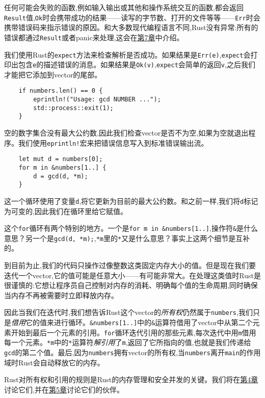 任何可能会失败的函数,例如输入输出或其他和操作系统交互的函数,都会返回\texttt{Result}值,\texttt{Ok}时会携带成功的结果——读写的字节数、打开的文件等等——\texttt{Err}时会携带错误码来指示错误的原因。和大多数现代编程语言不同,Rust没有异常:所有的错误都通过\texttt{Result}或者panic来处理,这会在\hyperref[ch07]{第7章}中介绍。

我们使用Rust的\texttt{expect}方法来检查解析是否成功。如果结果是\texttt{Err(e)},\texttt{expect}会打印出包含\texttt{e}的描述错误的消息。如果结果是\texttt{Ok(v)},\texttt{expect}会简单的返回\texttt{v},之后我们才能把它添加到vector的尾部。

\begin{verbatim}
    if numbers.len() == 0 {
        eprintln!("Usage: gcd NUMBER ...");
        std::process::exit(1);
    }
\end{verbatim}

空的数字集合没有最大公约数,因此我们检查vector是否不为空,如果为空就退出程序。我们使用\texttt{eprintln!}宏来把错误信息写入到标准错误输出流。

\begin{verbatim}
    let mut d = numbers[0];
    for m in &numbers[1..] {
        d = gcd(d, *m);
    }
\end{verbatim}

这一个循环使用了变量\texttt{d},将它更新为目前的最大公约数。和之前一样,我们将\texttt{d}标记为可变的,因此我们在循环里给它赋值。

这个\texttt{for}循环有两个特别的地方。一个是\texttt{for m in \&numbers[1..]},操作符\texttt{\&}是什么意思？另一个是\texttt{gcd(d, *m);},\texttt{*m}里的\texttt{*}又是什么意思？事实上这两个细节是互补的。

到目前为止,我们的代码只操作过像整数这类固定内存大小的值。但是现在我们要迭代一个vector,它的值可能是任意大小——有可能非常大。在处理这类值时Rust是很谨慎的:它想让程序员自己控制对内存的消耗、明确每个值的生命周期,同时确保当内存不再被需要时立即释放内存。

因此当我们在迭代时,我们想告诉Rust这个vector的\emph{所有权}仍然属于\texttt{numbers},我们只是\emph{借用}它的值来进行循环。\texttt{\&numbers[1..]}中的\texttt{\&}运算符借用了vector中从第二个元素开始到最后一个元素的引用。\texttt{for}循环迭代引用的那些元素,每次迭代中用\texttt{m}借用每一个元素。\texttt{*m}中的\texttt{*}运算符\emph{解引用}了\texttt{m},返回了它所指向的值,也就是我们传递给\texttt{gcd}的第二个值。最后,因为\texttt{numbers}拥有vector的所有权,当\texttt{numbers}离开\texttt{main}的作用域时Rust会自动释放它的内存。

Rust对所有权和引用的规则是Rust的内存管理和安全并发的关键。我们将在\hyperref[ch04]{第4章}讨论它们,并在\hyperref[ch05]{第5章}讨论它们的伙伴。

